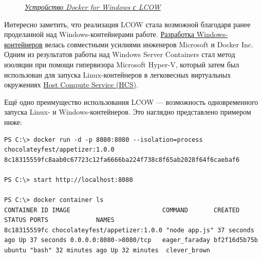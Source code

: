 \documentclass[14pt, a4paper]{article}
\begin{document}
\begin{figure}[H]
    \centering
    \caption*{\textit{\href{https://docs.microsoft.com/en-us/virtualization/windowscontainers/deploy-containers/linux-containers}{Устройство Docker for Windows с LCOW}}}
    \label{3.6}
\end{figure}

Интересно заметить, что реализация LCOW стала возможной благодаря ранее проделанной над
Windows-контейнерами работе. \href{https://azure.microsoft.com/ru-ru/blog/containers-docker-windows-and-trends/}{Разработка Windows-контейнеров} велась совместными усилиями
инженеров Microsoft и Docker Inc. Одним из результатов работы над Windows Server Containers стал
метод изоляции при помощи гипервизора Microsoft Hyper-V, который затем был использован для
запуска Linux-контейнеров в легковесных виртуальных окружениях \href{https://docs.microsoft.com/en-us/virtualization/community/team-blog/2017/20170127-introducing-the-host-compute-service-hcs}{Host Compute Service (HCS)}.

Ещё одно преимущество использования LCOW — возможность одновременного запуска Linux- и
Windows-контейнеров. Это наглядно представлено примером ниже:

\begin{lstlisting}
PS C:\> docker run -d -p 8080:8080 --isolation=process chocolateyfest/appetizer:1.0.0 
8c18315559fc8aab0c67723c12fa6666ba224f738c8f65ab2028f64f6caebaf6

PS C:\> start http://localhost:8080

PS C:\> docker container ls
CONTAINER ID IMAGE                         COMMAND       CREATED        STATUS PORTS             NAMES
8c18315559fc chocolateyfest/appetizer:1.0.0 "node app.js" 37 seconds ago Up 37 seconds 0.0.0.0:8080->8080/tcp   eager_faraday bf2f16d5b75b ubuntu "bash" 32 minutes ago Up 32 minutes  clever_brown

\end{lstlisting}
\end{document}
